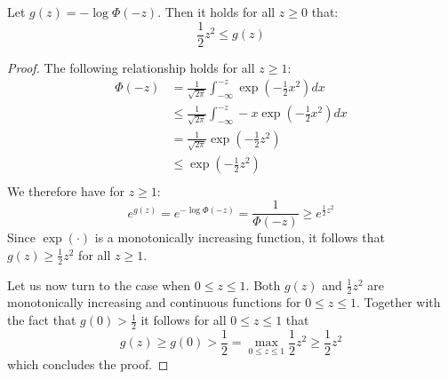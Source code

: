 \begin{lemma}
    Let $g(z) = -\log \Phi(-z)$. Then it holds for all $z \geq 0$ that:
    $$
        \frac{1}{2} z^2 \leq g(z)
    $$
\end{lemma}
\begin{proof}
    The following relationship holds for all $z \geq 1$:
    \begin{align*}
        \Phi(-z) & = \frac{1}{\sqrt{2 \pi}} \int_{-\infty}^{-z} \exp{ \left(-\frac{1}{2} x^2 \right)} dx       \\
                 & \leq \frac{1}{\sqrt{2 \pi}} \int_{-\infty}^{-z} -x \exp{ \left(-\frac{1}{2} x^2 \right)} dx \\
                 & = \frac{1}{\sqrt{2 \pi}} \exp{\left( -\frac{1}{2} z^2 \right)}                              \\
                 & \leq \exp{\left( -\frac{1}{2} z^2 \right)}                                                  \\
    \end{align*}
    We therefore have for $z \geq 1$:
    $$
        e^{g(z)} = e^{-\log \Phi(-z)} = \frac{1}{\Phi(-z)} \geq e^{\frac{1}{2} z^2}
    $$
    Since $\exp( \cdot )$ is a monotonically increasing function,
    it follows that $g(z) \geq \frac{1}{2}z^2$ for all $z \geq 1$.

    \noindent{}Let us now turn to the case when $0 \leq z \leq 1$.
    Both $g(z)$ and $\frac{1}{2}z^2$ are monotonically increasing
    and continuous functions for $0 \leq z \leq 1$.
    Together with the fact that $g(0) > \frac{1}{2}$ it follows
    for all $0 \leq z \leq 1$ that
    $$
        g(z) \geq g(0) > \frac{1}{2} = \max_{0 \leq z \leq 1} \frac{1}{2} z^2 \geq \frac{1}{2} z^2
    $$
    which concludes the proof.
\end{proof}

